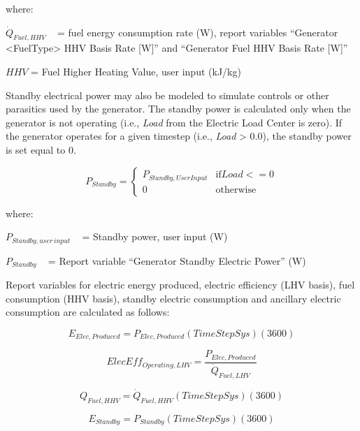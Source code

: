 where:

\({\dot Q_{Fuel,HHV}}\) ~ = fuel energy consumption rate (W), report variables ``Generator \textless{}FuelType\textgreater{} HHV Basis Rate {[}W{]}'' and ``Generator Fuel HHV Basis Rate {[}W{]}''

\(HHV\) = Fuel Higher Heating Value, user input (kJ/kg)

Standby electrical power may also be modeled to simulate controls or other parasitics used by the generator. The standby power is calculated only when the generator is not operating (i.e., \emph{Load} from the Electric Load Center is zero). If the generator operates for a given timestep (i.e., \emph{Load} \textgreater{} 0.0), the standby power is set equal to 0.

\begin{equation}
P_{Standby} = \left\{
  \begin{array}{cc}
    P_{Standby,UserInput} &\text{if} Load <= 0 \\
    0                     &\text{otherwise}
  \end{array}
\right.
\end{equation}

where:

\({P_{Standby,user\,input}}\) ~ = Standby power, user input (W)

\({P_{Standby}}\) ~ = Report variable ``Generator Standby Electric Power'' (W)

Report variables for electric energy produced, electric efficiency (LHV basis), fuel consumption (HHV basis), standby electric consumption and ancillary electric consumption are calculated as follows:

\begin{equation}
{E_{Elec,Produced}} = {P_{Elec,Produced}}\left( {TimeStepSys} \right)\left( {3600} \right)
\end{equation}

\begin{equation}
ElecEff_{Operating,LHV} = \frac{P_{Elec,Produced}}{\dot{Q}_{Fuel,LHV}}
\end{equation}

\begin{equation}
{Q_{Fuel,HHV}} = {\dot Q_{Fuel,HHV}}\left( {TimeStepSys} \right)\left( {3600} \right)
\end{equation}

\begin{equation}
{E_{Standby}} = {P_{Standby}}\left( {TimeStepSys} \right)\left( {3600} \right)
\end{equation}

